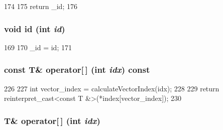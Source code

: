 \begin{DoxyCode}
174     {
175         return _id;
176     }
\end{DoxyCode}
\hypertarget{classTimeBuffer_a7f3a9af2f60b21012f5dab71251b5b8f}{
\subsubsection[{id}]{\setlength{\rightskip}{0pt plus 5cm}void id (int {\em id})}}
\label{classTimeBuffer_a7f3a9af2f60b21012f5dab71251b5b8f}



\begin{DoxyCode}
169     {
170         _id = id;
171     }
\end{DoxyCode}
\hypertarget{classTimeBuffer_a21e58a4115e3fe476f7a6677c14c54fa}{
\subsubsection[{operator[]}]{\setlength{\rightskip}{0pt plus 5cm}const T\& operator\mbox{[}$\,$\mbox{]} (int {\em idx}) const}}
\label{classTimeBuffer_a21e58a4115e3fe476f7a6677c14c54fa}



\begin{DoxyCode}
226     {
227         int vector_index = calculateVectorIndex(idx);
228 
229         return reinterpret_cast<const T &>(*index[vector_index]);
230     }
\end{DoxyCode}
\hypertarget{classTimeBuffer_a2a322a02b87eab70bf5d7d1f6e1b8842}{
\subsubsection[{operator[]}]{\setlength{\rightskip}{0pt plus 5cm}T\& operator\mbox{[}$\,$\mbox{]} (int {\em idx})}}
\label{classTimeBuffer_a2a322a02b87eab70bf5d7d1f6e1b8842}



